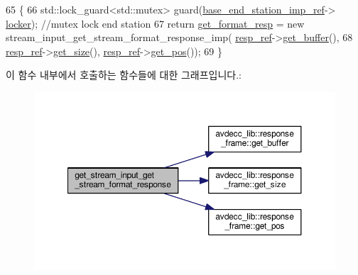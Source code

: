 \begin{DoxyCode}
65 \{
66     std::lock\_guard<std::mutex> guard(\hyperlink{classavdecc__lib_1_1descriptor__base__imp_a550c969411f5f3b69f55cc139763d224}{base\_end\_station\_imp\_ref}->
      \hyperlink{classavdecc__lib_1_1end__station__imp_a2207f93fef130266b292686bf96ef8d3}{locker}); \textcolor{comment}{//mutex lock end station}
67     \textcolor{keywordflow}{return} \hyperlink{classavdecc__lib_1_1stream__input__descriptor__imp_a50df3fb45f75a337893f84e4600f37da}{get\_format\_resp} = \textcolor{keyword}{new} stream\_input\_get\_stream\_format\_response\_imp(
      \hyperlink{classavdecc__lib_1_1descriptor__base__imp_a2642e3a7c10d38553e7ff4a55e875346}{resp\_ref}->\hyperlink{classavdecc__lib_1_1response__frame_ad4680d622c198b5256c03b2eb2638c22}{get\_buffer}(),
68                                                                              
      \hyperlink{classavdecc__lib_1_1descriptor__base__imp_a2642e3a7c10d38553e7ff4a55e875346}{resp\_ref}->\hyperlink{classavdecc__lib_1_1response__frame_adf55ed6a1edf8e1aa4f3f5f97936ad1e}{get\_size}(), \hyperlink{classavdecc__lib_1_1descriptor__base__imp_a2642e3a7c10d38553e7ff4a55e875346}{resp\_ref}->\hyperlink{classavdecc__lib_1_1response__frame_a4038092b7b420000faefc768241adb42}{get\_pos}());
69 \}
\end{DoxyCode}


이 함수 내부에서 호출하는 함수들에 대한 그래프입니다.\+:
\nopagebreak
\begin{figure}[H]
\begin{center}
\leavevmode
\includegraphics[width=350pt]{classavdecc__lib_1_1stream__input__descriptor__imp_a615d3c4d029d707264a5395d5587909f_cgraph}
\end{center}
\end{figure}


